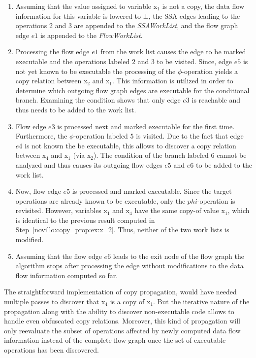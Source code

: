 \begin{enumerate}
\item Assuming that the value assigned to variable x$_1$ is not a copy, the data
      flow information for this variable is lowered to $\bot$, the SSA-edges
      leading to the operations $2$ and $3$ are appended to the
      \emph{SSAWorkList}, and the flow graph edge $e1$ is appended to the
      \emph{FlowWorkList}.
\item \label{novillo:copy_prop:ex:x_2} Processing the flow edge $e1$ from the
      work list causes the edge to be marked executable and the operations
      labeled $2$ and $3$ to be visited. Since, edge $e5$ is not yet known to be
      executable the processing of the $\phi$-operation yields a copy relation
      between x$_2$ and x$_1$. This information is utilized in order to
      determine which outgoing flow graph edges are executable for the
      conditional branch. Examining the condition shows that only edge $e3$ is
      reachable and thus needs to be added to the work list.
\item Flow edge $e3$ is processed next and marked executable for the first time.
      Furthermore, the $\phi$-operation labeled $5$ is visited. Due to the fact
      that edge $e4$ is not known the be executable, this allows to discover a
      copy relation between x$_4$ and x$_1$ (via x$_2$). The condition of the
      branch labeled $6$ cannot be analyzed and thus causes its outgoing flow
      edges $e5$ and $e6$ to be added to the work list.
\item Now, flow edge $e5$ is processed and marked executable. Since the target
      operations are already known to be executable, only the $phi$-operation is
      revisited. However, variables x$_1$ and x$_4$ have the same copy-of value
      x$_1$, which is identical to the previous result computed in
      Step~\ref{novillo:copy_prop:ex:x_2}. Thus, neither of the two work lists
      is modified.
\item Assuming that the flow edge $e6$ leads to the exit node of the flow graph
      the algorithm stops after processing the edge without modifications to
      the data flow information computed so far.
\end{enumerate}

The straightforward implementation of copy propagation, would have needed
multiple passes to discover that x$_4$ is a copy of x$_1$.  But the iterative
nature of the propagation along with the ability to discover non-executable
code allows to handle even obfuscated copy relations. Moreover, this kind of
propagation will only reevaluate the subset of operations affected by newly
computed data flow information instead of the complete flow graph once the set
of executable operations has been discovered.

